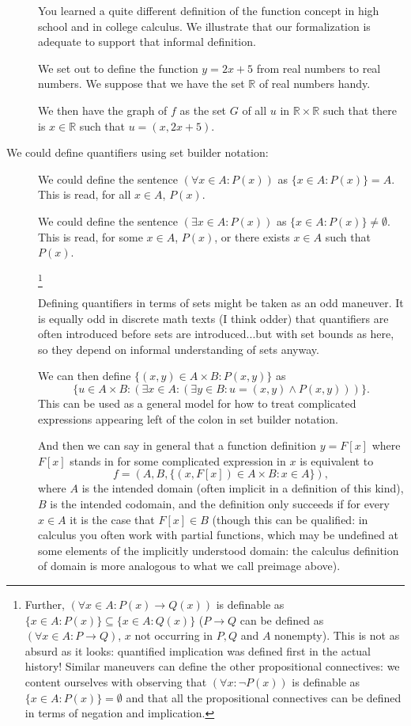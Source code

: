 \documentclass[12pt]{article}
\begin{document}
\begin{description}
You learned a quite different definition of the function concept in high school and in college calculus.  We illustrate that our formalization is adequate to support that informal definition.

We set out to define the function $y=2x+5$ from real numbers to real numbers.  We suppose that we have the set
$\mathbb R$ of real numbers handy.

We then have the graph of $f$ as the set $G$ of all $u$ in $\mathbb R \times \mathbb R$ such that there is $x \in \mathbb R$ such that $u = (x,2x+5)$.

\item[We could define quantifiers using set builder notation:]

We could define the sentence $(\forall x \in A:P(x))$ as $\{x \in A:P(x)\} = A$.  This is read, for all $x \in A$, $P(x)$.

We could define the sentence $(\exists x \in A:P(x))$ as $\{x \in A:P(x)\} \neq \emptyset$.  This is read, for some $x \in A$, $P(x)$, or there exists $x \in A$ such that $P(x)$.

\footnote{Further, $(\forall x \in A:P(x) \rightarrow Q(x))$ is definable as $\{x \in A:P(x)\} \subseteq \{x \in A:Q(x)\}$
($P \rightarrow Q$ can be defined as $(\forall x \in A:P \rightarrow Q)$, $x$ not occurring in $P,Q$ and $A$ nonempty).  This is not as  absurd as it looks:  quantified implication was defined first in the actual history!  Similar maneuvers can define the other propositional connectives:  we content ourselves with observing that $(\forall x:\neg P(x))$ is definable as $\{x \in A:P(x)\} = \emptyset$ and that all the propositional connectives can be defined in terms of negation and implication.}

Defining quantifiers in terms of sets might be taken as an odd maneuver.  It is equally odd in discrete math texts (I think odder) that quantifiers are often introduced before sets are introduced...but with set bounds as here, so they depend on informal understanding of sets anyway.

We can then define $\{(x,y) \in A \times B:P(x,y)\}$ as $$\{u \in A \times B:(\exists x \in A:(\exists y \in B:u=(x,y) \wedge P(x,y)))\}.$$ This can be used as a general model for how to treat complicated expressions appearing left of the colon in set builder notation.

And then we can say in general that a function definition $y = F[x]$ where $F[x]$ stands in for some complicated expression in $x$ is equivalent to $$f=(A,B,\{(x,F[x]) \in A \times B:x\in A\}),$$  where $A$ is the intended domain (often implicit in a definition of this kind), $B$ is the intended codomain, and the definition only succeeds if for every $x \in A$ it is the case that $F[x] \in B$ (though this can be qualified:  in calculus you often work with partial functions, which may be undefined at some elements of the implicitly understood domain:  the calculus definition of domain is more analogous to what we call preimage above).


\end{description}
\end{document}

